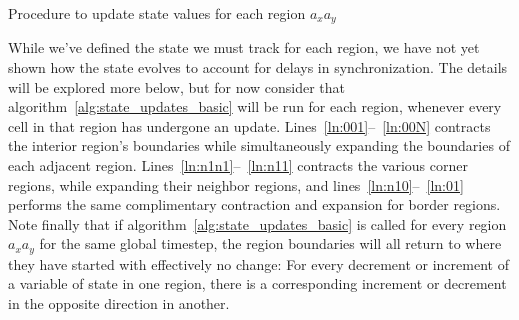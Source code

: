 \begin{algorithm}[h]
  \setcounter{AlgoLine}{0}
  \caption{Procedure to update state values for each region $a_xa_y$}
  \label{alg:state_updates_basic}
\end{algorithm}

  While we've defined the state we must track for each region,
we have not yet shown how the state evolves to account for delays in synchronization.
The details will be explored more
  below, but for now consider that algorithm~\ref{alg:state_updates_basic} will
 be run for each region, whenever every cell in that region has
 undergone an update. Lines~\ref{ln:001}--~\ref{ln:00N} contracts the interior region's
 boundaries
 while simultaneously expanding the boundaries of each adjacent region.
 Lines~\ref{ln:n1n1}--~\ref{ln:n11}
 contracts the various corner regions, while expanding their neighbor
 regions, and lines~\ref{ln:n10}--~\ref{ln:01} performs the same
 complimentary contraction and expansion for border regions.
 Note finally that if algorithm~\ref{alg:state_updates_basic} is called
 for every region $a_xa_y$ for the same global timestep, the region boundaries
 will all return to where they have started with
 effectively no change:  For every decrement or increment of a
 variable of state in one region, there is a corresponding increment or decrement
 in the opposite direction in another.

